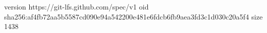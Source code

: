 version https://git-lfs.github.com/spec/v1
oid sha256:af4fb72aa5b5587cd090e94a542200e481e6fdcb6fb9aea3fd3c1d030c20a5f4
size 1438
